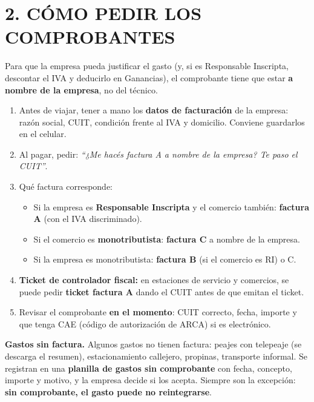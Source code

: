 \section*{2. CÓMO PEDIR LOS COMPROBANTES}

Para que la empresa pueda justificar el gasto (y, si es Responsable Inscripta, descontar el
IVA y deducirlo en Ganancias), el comprobante tiene que estar \textbf{a nombre de la empresa},
no del técnico.

\begin{enumerate}
  \item Antes de viajar, tener a mano los \textbf{datos de facturación} de la empresa: razón
        social, CUIT, condición frente al IVA y domicilio. Conviene guardarlos en el celular.
  \item Al pagar, pedir: \textit{``¿Me hacés factura A a nombre de la empresa? Te paso el
        CUIT''}.
  \item Qué factura corresponde:
  \begin{itemize}
    \item Si la empresa es \textbf{Responsable Inscripta} y el comercio también:
          \textbf{factura A} (con el IVA discriminado).
    \item Si el comercio es \textbf{monotributista}: \textbf{factura C} a nombre de la
          empresa.
    \item Si la empresa es monotributista: \textbf{factura B} (si el comercio es RI) o C.
  \end{itemize}
  \item \textbf{Ticket de controlador fiscal:} en estaciones de servicio y comercios, se puede
        pedir \textbf{ticket factura A} dando el CUIT antes de que emitan el ticket.
  \item Revisar el comprobante \textbf{en el momento}: CUIT correcto, fecha, importe y que
        tenga CAE (código de autorización de ARCA) si es electrónico.
\end{enumerate}

\begin{recuadro}
\textbf{Gastos sin factura.} Algunos gastos no tienen factura: peajes con telepeaje (se
descarga el resumen), estacionamiento callejero, propinas, transporte informal. Se registran
en una \textbf{planilla de gastos sin comprobante} con fecha, concepto, importe y motivo, y la
empresa decide si los acepta. Siempre son la excepción: \textbf{sin comprobante, el gasto
puede no reintegrarse}.
\end{recuadro}

